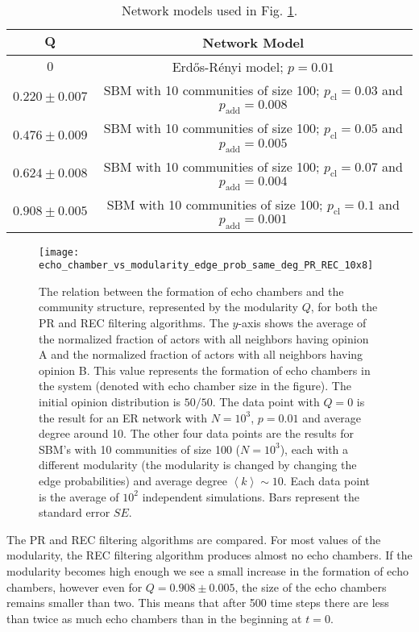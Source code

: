 \documentclass[11 pt , letterpaper , twoside , openright]{book}
\begin{document}
\begin{table}[H]
\centering
\setlength{\tabcolsep}{10pt} %
\renewcommand{\arraystretch}{1.5} %
\begin{tabular}{c | c}
$\bm{Q}$ & \textbf{Network Model} \\
\hline
$0$ & Erd\H{o}s-R\'{e}nyi model; $p=0.01$ \\
$0.220 \pm 0.007$ & SBM with 10 communities of size 100; $p_{\text{cl}} = 0.03$ and $p_{\text{add}} = 0.008$ \\
$0.476 \pm 0.009$ & SBM with 10 communities of size 100; $p_{\text{cl}} = 0.05$ and $p_{\text{add}} = 0.005$ \\
$0.624 \pm 0.008$ & SBM with 10 communities of size 100; $p_{\text{cl}} = 0.07$ and $p_{\text{add}} = 0.004$ \\
$0.908 \pm 0.005$ & SBM with 10 communities of size 100; $p_{\text{cl}} = 0.1$ and $p_{\text{add}} = 0.001$ \\
\end{tabular}
\caption{Network models used in Fig. \ref{echo_vs_mod}.}
\label{tab1}
\end{table}
\newpage
\begin{figure}[H]
	\texttt{[image: echo\_chamber\_vs\_modularity\_edge\_prob\_same\_deg\_PR\_REC\_10x8]}
	\captionsetup{format=plain}
	\caption[Relation between the formation of echo chambers and community structure (modularity $Q$).]{The relation between the formation of echo chambers and the community structure, represented by the modularity $Q$, for both the PR and REC filtering algorithms. The $y$-axis shows the average of the normalized fraction of actors with all neighbors having opinion A and the normalized fraction of actors with all neighbors having opinion B. This value represents the formation of echo chambers in the system (denoted with echo chamber size in the figure). The initial opinion distribution is $50/50$. The data point with $Q = 0$ is the result for an ER network with $N = 10^3$, $p = 0.01$ and average degree around 10. The other four data points are the results for SBM's with 10 communities of size 100 ($N = 10^3$), each with a different modularity (the modularity is changed by changing the edge probabilities) and average degree $\left<k\right> \sim 10$. Each data point is the average of $10^2$ independent simulations. Bars represent the standard error $SE$.}
\label{echo_vs_mod}
\end{figure}
\noindent
The PR and REC filtering algorithms are compared. For most values of the modularity, the REC filtering algorithm produces almost no echo chambers. If the modularity becomes high enough we see a small increase in the formation of echo chambers, however even for $Q = 0.908 \pm 0.005$, the size of the echo chambers remains smaller than two. This means that after 500 time steps there are less than twice as much echo chambers than in the beginning at $t=0$.\\
\end{document}
